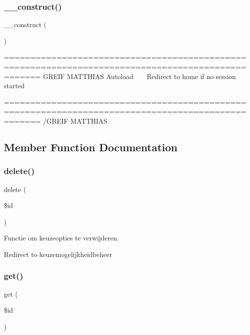 \subsubsection{\texorpdfstring{\+\_\+\+\_\+construct()}{\_\_construct()}}
{\footnotesize\ttfamily \+\_\+\+\_\+construct (\begin{DoxyParamCaption}{ }\end{DoxyParamCaption})}

=================================================================================================== G\+R\+E\+IF M\+A\+T\+T\+H\+I\+AS Autoload ~\newline
~\newline
 Redirect to home if no session started

=================================================================================================== /\+G\+R\+E\+IF M\+A\+T\+T\+H\+I\+AS 

\subsection{Member Function Documentation}
\mbox{\label{class_keuzeoptie_a2f8258add505482d7f00ea26493a5723}} 
\subsubsection{\texorpdfstring{delete()}{delete()}}
{\footnotesize\ttfamily delete (\begin{DoxyParamCaption}\item[{}]{\$id }\end{DoxyParamCaption})}



Functie om keuzeopties te verwijderen. 

Redirect to keuzemogelijkheidbeheer \mbox{\label{class_keuzeoptie_a50e3bfb586b2f42932a6a93f3fbb0828}} 
\subsubsection{\texorpdfstring{get()}{get()}}
{\footnotesize\ttfamily get (\begin{DoxyParamCaption}\item[{}]{\$id }\end{DoxyParamCaption})}

